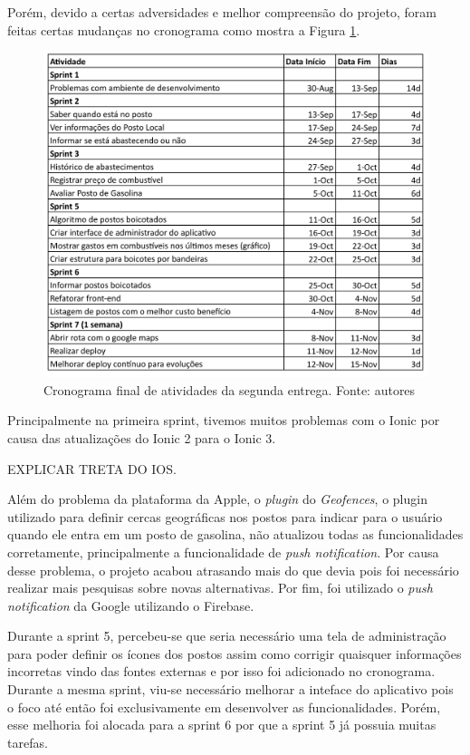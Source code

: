 Porém, devido a certas adversidades e melhor compreensão do projeto, foram feitas certas mudanças no cronograma como mostra a Figura \ref{img:cronogramafinal}.

\begin{figure}[H]
    \centering
    \includegraphics[scale=0.5]{figuras/cronograma-final.png}
    \caption[Cronograma final de atividades da segunda entrega.]{Cronograma final de atividades da segunda entrega. Fonte: autores}
    \label{img:cronogramafinal}
\end{figure}

Principalmente na primeira sprint, tivemos muitos problemas com o Ionic por causa das atualizações do Ionic 2 para o Ionic 3. 

EXPLICAR TRETA DO IOS.

Além do problema da plataforma da Apple, o \textit{plugin} do \textit{Geofences}, o plugin utilizado para definir cercas geográficas nos postos para indicar para o usuário quando ele entra em um posto de gasolina, não atualizou todas as funcionalidades corretamente, principalmente a funcionalidade de \textit{push notification}. Por causa desse problema, o projeto acabou atrasando mais do que devia pois foi necessário realizar mais pesquisas sobre novas alternativas. Por fim, foi utilizado o \textit{push notification} da Google utilizando o Firebase.

Durante a sprint 5, percebeu-se que seria necessário uma tela de administração para poder definir os ícones dos postos assim como corrigir quaisquer informações incorretas vindo das fontes externas e por isso foi adicionado no cronograma. Durante a mesma sprint, viu-se necessário melhorar a inteface do aplicativo pois o foco até então foi exclusivamente em desenvolver as funcionalidades. Porém, esse melhoria foi alocada para a sprint 6 por que a sprint 5 já possuia muitas tarefas.

